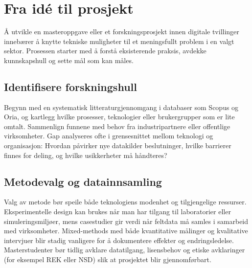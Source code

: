 \section{Fra idé til prosjekt}
Å utvikle en masteroppgave eller et forskningsprosjekt innen digitale tvillinger innebærer å knytte tekniske muligheter til et meningsfullt problem i en valgt sektor. Prosessen starter med å forstå eksisterende praksis, avdekke kunnskapshull og sette mål som kan måles.

\subsection{Identifisere forskningshull}
Begynn med en systematisk litteraturgjennomgang i databaser som Scopus og Oria, og kartlegg hvilke prosesser, teknologier eller brukergrupper som er lite omtalt. Sammenlign funnene med behov fra industripartnere eller offentlige virksomheter. Gap analyseres ofte i grensesnittet mellom teknologi og organisasjon: Hvordan påvirker nye datakilder beslutninger, hvilke barrierer finnes for deling, og hvilke usikkerheter må håndteres?

\subsection{Metodevalg og datainnsamling}
Valg av metode bør speile både teknologiens modenhet og tilgjengelige ressurser. Eksperimentelle design kan brukes når man har tilgang til laboratorier eller simuleringsmiljøer, mens casestudier gir verdi når feltdata må samles i samarbeid med virksomheter. Mixed-methods med både kvantitative målinger og kvalitative intervjuer blir stadig vanligere for å dokumentere effekter og endringsledelse. Masterstudenter bør tidlig avklare datatilgang, lisensbehov og etiske avklaringer (for eksempel REK eller NSD) slik at prosjektet blir gjennomførbart.

